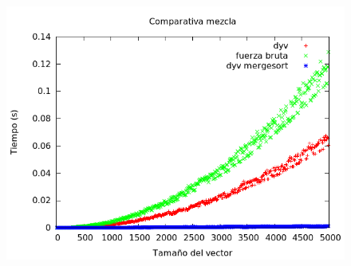 \begin{frame}
\begin{figure}[h]
	\centering
	\includegraphics[width=1\textwidth]{../Opcional/Graficas/comparativa.png}
\end{figure}
\end{frame}
